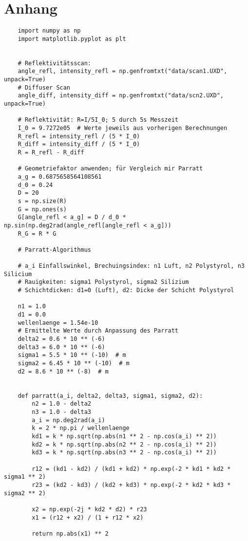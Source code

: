\section{Anhang}
\label{sec:anhang}
\begin{lstlisting}
    import numpy as np
    import matplotlib.pyplot as plt
    
    
    # Reflektivitätsscan:
    angle_refl, intensity_refl = np.genfromtxt("data/scan1.UXD", unpack=True)
    # Diffuser Scan
    angle_diff, intensity_diff = np.genfromtxt("data/scn2.UXD", unpack=True)
    
    # Reflektivität: R=I/5I_0; 5 durch 5s Messzeit
    I_0 = 9.7272e05  # Werte jeweils aus vorherigen Berechnungen
    R_refl = intensity_refl / (5 * I_0)
    R_diff = intensity_diff / (5 * I_0)
    R = R_refl - R_diff
    
    # Geometriefaktor anwenden; für Vergleich mir Parratt
    a_g = 0.6875658564108561
    d_0 = 0.24
    D = 20
    s = np.size(R)
    G = np.ones(s)
    G[angle_refl < a_g] = D / d_0 * np.sin(np.deg2rad(angle_refl[angle_refl < a_g]))
    R_G = R * G
    
    # Parratt-Algorithmus
    
    # a_i Einfallswinkel, Brechuingsindex: n1 Luft, n2 Polystyrol, n3 Silicium
    # Rauigkeiten: sigma1 Polystyrol, sigma2 Silizium
    # Schichtdicken: d1=0 (Luft), d2: Dicke der Schicht Polystyrol
    
    n1 = 1.0
    d1 = 0.0
    wellenlaenge = 1.54e-10
    # Ermittelte Werte durch Anpassung des Parratt
    delta2 = 0.6 * 10 ** (-6)
    delta3 = 6.0 * 10 ** (-6)
    sigma1 = 5.5 * 10 ** (-10)  # m
    sigma2 = 6.45 * 10 ** (-10)  # m
    d2 = 8.6 * 10 ** (-8)  # m
    
    
    def parratt(a_i, delta2, delta3, sigma1, sigma2, d2):
        n2 = 1.0 - delta2
        n3 = 1.0 - delta3
        a_i = np.deg2rad(a_i)
        k = 2 * np.pi / wellenlaenge
        kd1 = k * np.sqrt(np.abs(n1 ** 2 - np.cos(a_i) ** 2))
        kd2 = k * np.sqrt(np.abs(n2 ** 2 - np.cos(a_i) ** 2))
        kd3 = k * np.sqrt(np.abs(n3 ** 2 - np.cos(a_i) ** 2))
    
        r12 = (kd1 - kd2) / (kd1 + kd2) * np.exp(-2 * kd1 * kd2 * sigma1 ** 2)
        r23 = (kd2 - kd3) / (kd2 + kd3) * np.exp(-2 * kd2 * kd3 * sigma2 ** 2)
    
        x2 = np.exp(-2j * kd2 * d2) * r23
        x1 = (r12 + x2) / (1 + r12 * x2)
    
        return np.abs(x1) ** 2
    

\end{lstlisting}
